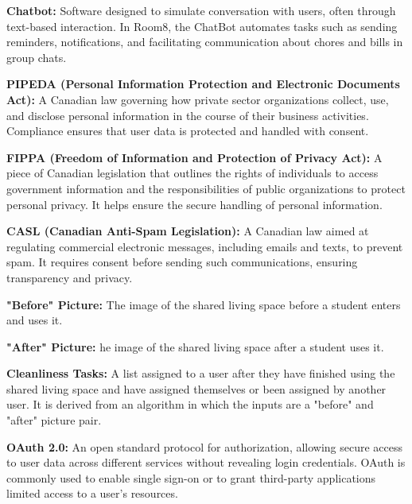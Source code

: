 \documentclass{scrreprt}
\theoremstyle{definition}
\begin{document}
\begin{flushleft}
    \item \textbf{Chatbot:} Software designed to simulate conversation with users, often through text-based interaction. In Room8, the ChatBot automates tasks such as sending reminders, notifications, and facilitating communication about chores and bills in group chats.\newline

    \item \textbf{PIPEDA (Personal Information Protection and Electronic Documents Act):} A Canadian law governing how private sector organizations collect, use, and disclose personal information in the course of their business activities. Compliance ensures that user data is protected and handled with consent.\newline

    \item \textbf{FIPPA (Freedom of Information and Protection of Privacy Act):} A piece of Canadian legislation that outlines the rights of individuals to access government information and the responsibilities of public organizations to protect personal privacy. It helps ensure the secure handling of personal information.\newline

    \item \textbf{CASL (Canadian Anti-Spam Legislation):} A Canadian law aimed at regulating commercial electronic messages, including emails and texts, to prevent spam. It requires consent before sending such communications, ensuring transparency and privacy.\newline

    \item \textbf{"Before" Picture:} The image of the shared living space before a student enters and uses it.\newline

    \item \textbf{"After" Picture:} he image of the shared living space after a student uses it.\newline

    \item \textbf{Cleanliness Tasks:} A list assigned to a user after they have finished using the shared living space and have assigned themselves or been assigned by another user. It is derived from an algorithm in which the inputs are a "before" and "after" picture pair.\newline

    \item \textbf{OAuth 2.0:} An open standard protocol for authorization, allowing secure access to user data across different services without revealing login credentials. OAuth is commonly used to enable single sign-on or to grant third-party applications limited access to a user's resources.\newline


\end{flushleft}
\end{document}
